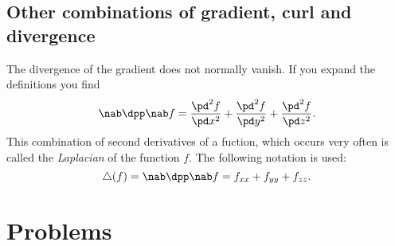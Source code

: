 \subsection{Other combinations of gradient, curl and divergence} 
The divergence of the gradient does not normally vanish.   If you expand the
definitions you find
\[
\nab\dpp\nab f =
\frac{\pd^2 f} {\pd x^2} +\frac{\pd^2 f} {\pd y^2} +\frac{\pd^2 f} {\pd z^2}.
\]
This combination of second derivatives of a fuction, which occurs very
often is called the \emph{Laplacian} of the function $f$.   The following
notation is used:
\[
\triangle (f) = \nab\dpp\nab f = f_{xx} + f_{yy} + f_{zz}.
\]


\section{Problems}  
\problemfont
